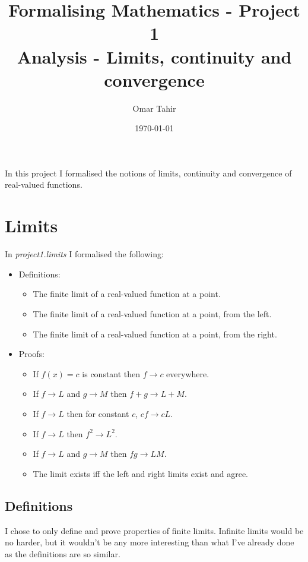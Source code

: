 \documentclass[a4paper, twoside, 11pt]{article}
\title{Formalising Mathematics - Project 1 \\ Analysis - Limits, continuity and convergence}
\author{Omar Tahir}
\date{\today}
\theoremstyle{definition}
\theoremstyle{plain}
\theoremstyle{remark}
\begin{document}
\maketitle

In this project I formalised the notions of limits, continuity and convergence of real-valued functions.

\section{Limits}

In \emph{project1.limits} I formalised the following:
\begin{itemize}
    \item Definitions:
    \begin{itemize}
        \item The finite limit of a real-valued function at a point.
        \item The finite limit of a real-valued function at a point, from the left.
        \item The finite limit of a real-valued function at a point, from the right.
    \end{itemize}
    \item Proofs:
    \begin{itemize}
        \item If $f(x) = c$ is constant then $f \rightarrow c$ everywhere.
        \item If $f \rightarrow L$ and $g \rightarrow M$ then $f + g \rightarrow L + M$.
        \item If $f \rightarrow L$ then for constant $c$, $cf \rightarrow cL$.
        \item If $f \rightarrow L$ then $f^{2} \rightarrow L^{2}$.
        \item If $f \rightarrow L$ and $g \rightarrow M$ then $fg \rightarrow LM$.
        \item The limit exists iff the left and right limits exist and agree.
    \end{itemize}
\end{itemize}

\subsection*{Definitions}

I chose to only define and prove properties of finite limits. Infinite limits would be no harder, but it wouldn't be any more interesting than what I've already done as the definitions are so similar.
\end{document}
